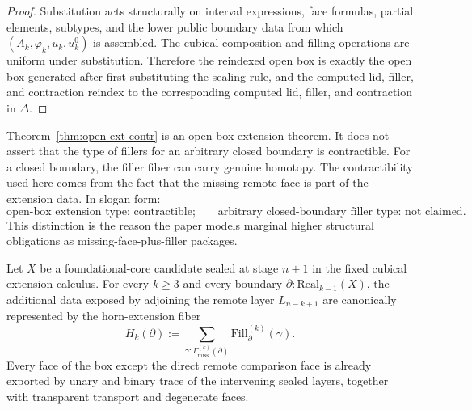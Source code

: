 \begin{proof}
Substitution acts structurally on interval expressions, face formulas, partial elements,
subtypes, and the lower public boundary data from which \((A_k,\varphi_k,u_k,u^0_k)\) is
assembled.  The cubical composition and filling operations are uniform under substitution.
Therefore the reindexed open box is exactly the open box generated after first substituting
the sealing rule, and the computed lid, filler, and contraction reindex to the corresponding
computed lid, filler, and contraction in \(\Delta\).
\end{proof}

\begin{remark}
\label{rem:open-not-closed}
Theorem~\ref{thm:open-ext-contr} is an open-box extension theorem.  It does not assert that
the type of fillers for an arbitrary closed boundary is contractible.  For a closed boundary,
the filler fiber can carry genuine homotopy.  The contractibility used here comes from the
fact that the missing remote face is part of the extension data.  In slogan form:
\[
  \text{open-box extension type: contractible;}
  \qquad
  \text{arbitrary closed-boundary filler type: not claimed.}
\]
This distinction is the reason the paper models marginal higher structural obligations as
missing-face-plus-filler packages.
\end{remark}

\begin{lemma}
\label{lem:syntactic-horn-reduction}
Let \(X\) be a foundational-core candidate sealed at stage \(n+1\) in the fixed cubical
extension calculus.  For every \(k\geq 3\) and every boundary
\(\partial:\mathrm{Real}_{k-1}(X)\), the additional data exposed by adjoining the remote layer
\(L_{n-k+1}\) are canonically represented by the horn-extension fiber
\[
  H_k(\partial)
  :=
  \sum_{\gamma:\Gamma_{\mathrm{miss}}^{(k)}(\partial)}
  \mathrm{Fill}^{(k)}_{\partial}(\gamma).
\]
Every face of the box except the direct remote comparison face is already exported by unary
and binary trace of the intervening sealed layers, together with transparent transport and
degenerate faces.
\end{lemma}

